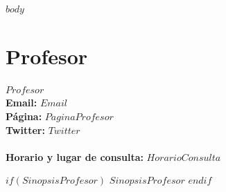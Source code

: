 \documentclass[11pt,fleqn]{report}
\begin{document}

\setcounter{section}{1}

\newpage
$body$


\section{Profesor}

$Profesor$ \vspace{5mm} \\
\textbf{Email:} $Email$ \\
\textbf{Página:} $PaginaProfesor$ \\
\textbf{Twitter:} $Twitter$
\\
\\
\textbf{Horario y lugar de consulta:} $HorarioConsulta$

$if(SinopsisProfesor)$
$SinopsisProfesor$ %
$endif$
\end{document}
